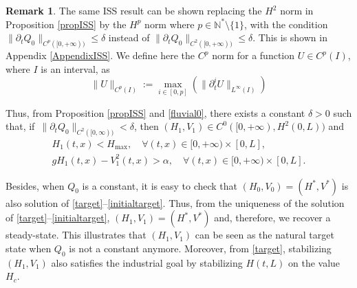 \documentclass[JEP,XML,SOM,Unicode]{cedram}
\theoremstyle{definition}
\newtheorem{rmk}[thm]{Remark}
\begin{document}
\begin{rmk}
\label{rmkHpISS}
The same ISS result can be shown replacing the $H^{2}$ norm in Proposition \ref{propISS} by the $H^{p}$ norm where ${p\in\mathbb{N}^{*}\setminus\{1\}}$, with the condition $\lVert\partial_{t}Q_{0}\rVert_{C^{p}([0,+\infty))}\leq\delta$ instead of $\lVert\partial_{t}Q_{0}\rVert_{C^{2}([0,+\infty))}\leq\delta$. This is shown in Appendix \ref{AppendixISS}. {We define here the $C^{p}$ norm for a function $U\in C^{p}(I)$, where $I$ is an interval, as
\begin{equation*}
\rVert U \lVert_{C^{p}(I)}:=\max_{i\in[0,p]}(\lVert \partial_{t}^{i}U\rVert_{L^{\infty}(I)})
\end{equation*}}
\end{rmk}

Thus, from Proposition \ref{propISS} and \eqref{fluvial0}, there exists a constant ${\delta}>0$ such that, if~$\lVert\partial_{t}Q_{0}\rVert_{{C^{2}([0,\infty))}}<{\delta}$, then $(H_{1},V_{1})\in C^{0}([0,+\infty),H^{2}(0,L))$ and
\begin{gather}
H_{1}(t,x)<H_{\max},\quad\forall(t,x)\in[0,+\infty)\times[0,L],
\label{Hinfty}\\
gH_{1}(t,x)-V_{1}^{2}(t,x)>\alpha,\quad\forall (t,x)\in[0,+\infty)\times[0,L].
\label{fluvial}
\end{gather}

Besides, when $Q_{0}$ is a constant, it is easy to check that $(H_{0},V_{0})=(H^{*},V^{*})$ is also solution of \eqref{target}--\eqref{initialtarget}. Thus, from the uniqueness of the solution of \eqref{target}--\eqref{initialtarget},
$(H_{1},V_{1})=(H^{*},V^{*})$ and, therefore, we recover a steady-state.
This illustrates that $(H_{1},V_{1})$ can be seen as the natural target state
when $Q_{0}$ is not a constant anymore.
Moreover, from \eqref{target}, stabilizing $(H_{1},V_{1})$ also satisfies the industrial goal by stabilizing $H(t,L)$ on the value $H_{c}$.
\end{document}
